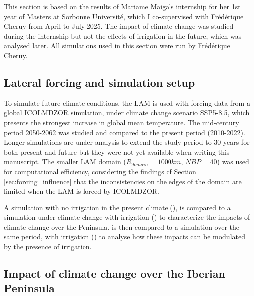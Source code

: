 This section is based on the results of Mariame Maiga's internship for her 1st year of Masters at Sorbonne Université, which I co-supervised with Frédérique Cheruy from April to July 2025. The impact of climate change was studied during the internship but not the effects of irrigation in the future, which was analysed later. All simulations used in this section were run by Frédérique Cheruy.

\subsection{Lateral forcing and simulation setup}

To simulate future climate conditions, the LAM is used with forcing data from a global ICOLMDZOR simulation, under climate change scenario SSP5-8.5, which presents the strongest increase in global mean temperature. The mid-century period 2050-2062 was studied and compared to the present period (2010-2022). Longer simulations are under analysis to extend the study period to 30 years for both present and future but they were not yet available when writing this manuscript.
The smaller LAM domain ($R_{domain} = 1000 km$, $NBP=40$) was used for computational efficiency, considering the findings of Section \ref{sec:forcing_influence} that the inconsistencies on the edges of the domain are limited when the LAM is forced by ICOLMDZOR.

A simulation with no irrigation in the present climate (\presnoirr), is compared to a simulation under climate change with irrigation (\futnoirr) to characterize the impacts of climate change over the Peninsula. \futnoirr is then compared to a simulation over the same period, with irrigation (\futirr) to analyse how these impacts can be modulated by the presence of irrigation.

\subsection{Impact of climate change over the Iberian Peninsula}

